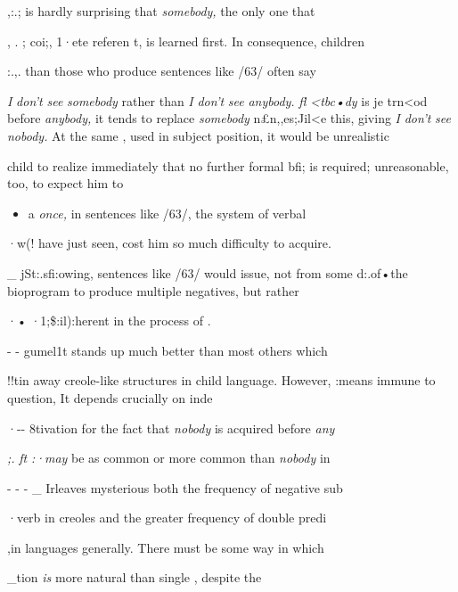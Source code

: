 ,:.; is hardly surprising that \textit{somebo}\textit{d}\textit{y,} the only one that

, . ; coi;, 1·ete referen t, is learned first. In consequence, children

:.,. than those who produce sentences like /63/ often say

\textit{I} \textit{don't} \textit{see} \textit{somebo}\textit{d}\textit{y} rather than \textit{I} \textit{don't} \textit{see} \textit{anybody.} \textit{fl} \textit{{\textless}tbc•dy} is je trn{\textless}od before \textit{anybody,} it tends to replace \textit{somebo}\textit{d}\textit{y} n£n,,es;Jil{\textless}e this, giving \textit{I} \textit{don't} \textit{see nobody.} At the same , used in subject position, it would be unrealistic

child to realize immediately that no further formal bfi; is required; unreasonable, too, to expect him to

\begin{itemize}
\item a \textit{once,} in sentences like /63/, the system of verbal 
\end{itemize}

·w(! have just seen, cost him so much difficulty to acquire.

\_ jSt:.sfi:owing, sentences like /63/ would issue, not from some  d:.of•the bioprogram to produce multiple negatives, but rather

·• ·1;\$:il):herent in the process of  .

{}- {}- gumel1t stands up much better than most others which

!!tin away creole-like structures in child language. However,
:means immune to question, It depends crucially on inde\-

·{}-{}- 8tivation for the fact that \textit{nobody }is acquired before \textit{any\-}

\textit{;.} \textit{ft} \textit{:}\textit{·}\textit{may} be as common or more common than \textit{nobo}\textit{d}\textit{y} in

{}- {}- {}- \_ Irleaves mysterious both the frequency of negative sub\-

·verb in creoles and the greater frequency of double predi\-

,in languages generally. There must be some way in which

\_tion \textit{is} more natural than single , despite the

